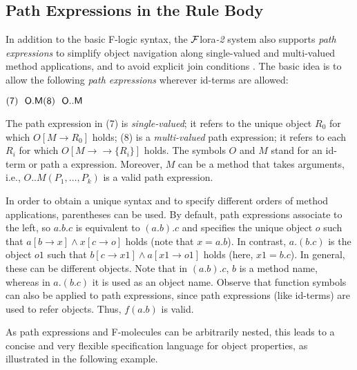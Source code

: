 \documentclass[11pt]{article}
\newcommand{\fd}{\ensuremath{{\rightarrow}}}                   %
\newcommand{\mvd}{\ensuremath{{\rightarrow\!\!\!\!\rightarrow}}}  %
\newcommand{\FLORA}{{\mbox{${\cal F}${\sc lora}\rm\emph{-2}}}\xspace}
\newcommand{\fl}{\mbox{F-logic}\xspace}
\begin{document}
\subsection{Path Expressions in the Rule Body}


In addition to the basic \fl syntax, the \FLORA  system also supports
\emph{path expressions} to simplify object navigation along
single-valued and multi-valued method applications, and to avoid
explicit join conditions \cite{frohn-lausen-uphoff-VLDB-94}.  The
basic idea is to allow the following \emph{path expressions} wherever
id-terms are allowed:

  \medskip

\begin{math} \sf
  \hfill (7)~~O.M \hfill (8)~~O..M \hfill
\end{math} \medskip

\noindent
The path expression in (7) is \emph{single-valued}; it refers to the unique
object $R_0$ for which $O[M\fd R_0]$ holds; (8) is a \emph{multi-valued}
path expression; it refers to each $R_i$ for which $O[M\mvd\{R_i\}]$ holds.
The symbols $O$ and $M$ stand for an id-term or path a expression.
Moreover, $M$ can be a method that takes arguments, i.e.,
$O..M(P_1,\dots,P_k)$ is a valid path expression.
  
In order to obtain a unique syntax and to specify different orders of
method applications, parentheses can be used. By default, path expressions
associate to the left, so $a.b.c$ is equivalent to $(a.b).c$ and specifies
the unique object $o$ such that $a[b\fd x] \land x[c\fd o]$ holds (note
that $x=a.b$). In contrast, $a.(b.c)$ is the object $o1$ such that $b[c\fd
x1] \land a[x1\fd o1]$ holds (here, $x1=b.c$). In general, these can be
different objects. Note that in $(a.b).c$, $b$ is a method name, whereas in
$a.(b.c)$ it is used as an object name.  Observe that function symbols can
also be applied to path expressions, since path expressions (like id-terms)
are used to refer objects. Thus, $f(a.b)$ is valid.

As path expressions and F-molecules can be arbitrarily nested, this leads
to a concise and very flexible specification language for object
properties, as illustrated in the following example.
\end{document}
